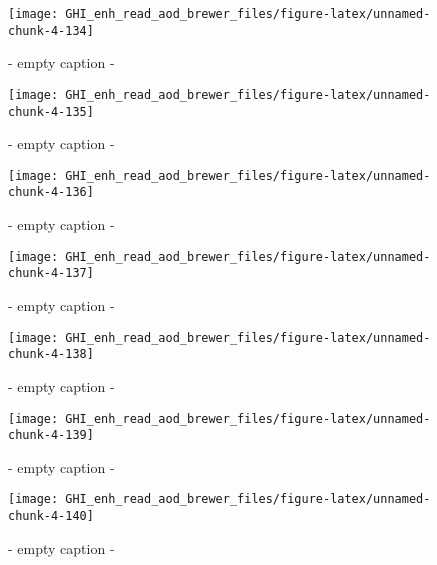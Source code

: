 \documentclass[
  10pt,
  a4paper,oneside]{article}
\begin{document}
\begin{figure}[H]

{\centering \texttt{[image: GHI\_enh\_read\_aod\_brewer\_files/figure-latex/unnamed-chunk-4-134]} 

}

\caption{ - empty caption - }\label{fig:unnamed-chunk-4-134}
\end{figure}
\begin{figure}[H]

{\centering \texttt{[image: GHI\_enh\_read\_aod\_brewer\_files/figure-latex/unnamed-chunk-4-135]} 

}

\caption{ - empty caption - }\label{fig:unnamed-chunk-4-135}
\end{figure}
\begin{figure}[H]

{\centering \texttt{[image: GHI\_enh\_read\_aod\_brewer\_files/figure-latex/unnamed-chunk-4-136]} 

}

\caption{ - empty caption - }\label{fig:unnamed-chunk-4-136}
\end{figure}
\begin{figure}[H]

{\centering \texttt{[image: GHI\_enh\_read\_aod\_brewer\_files/figure-latex/unnamed-chunk-4-137]} 

}

\caption{ - empty caption - }\label{fig:unnamed-chunk-4-137}
\end{figure}
\begin{figure}[H]

{\centering \texttt{[image: GHI\_enh\_read\_aod\_brewer\_files/figure-latex/unnamed-chunk-4-138]} 

}

\caption{ - empty caption - }\label{fig:unnamed-chunk-4-138}
\end{figure}
\begin{figure}[H]

{\centering \texttt{[image: GHI\_enh\_read\_aod\_brewer\_files/figure-latex/unnamed-chunk-4-139]} 

}

\caption{ - empty caption - }\label{fig:unnamed-chunk-4-139}
\end{figure}
\begin{figure}[H]

{\centering \texttt{[image: GHI\_enh\_read\_aod\_brewer\_files/figure-latex/unnamed-chunk-4-140]} 

}

\caption{ - empty caption - }\label{fig:unnamed-chunk-4-140}
\end{figure}
\end{document}
